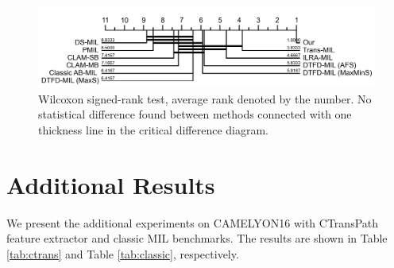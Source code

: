  \begin{figure}[h]
    \centering
    \includegraphics[width=0.7\columnwidth]{Figure/ranktest.png}
    \vspace{-0.3cm}
    \caption{Wilcoxon signed-rank test, average rank denoted by the number. No statistical difference found between methods connected with one thickness line in the critical difference diagram.
}
    \label{fig:cd}
    \vspace{-0.3cm}
\end{figure}


\section{Additional Results}
We present the additional experiments on CAMELYON16 with CTransPath feature extractor and classic MIL benchmarks. The results are shown in Table \ref{tab:ctrans} and Table \ref{tab:classic}, respectively.



